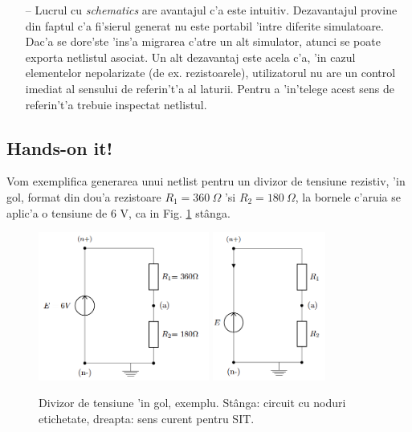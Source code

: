 \begin{itemize}
\item[--] Lucrul cu \textit{schematics} are avantajul c'a este intuitiv. Dezavantajul provine din faptul c'a fi'sierul generat nu este portabil 'intre diferite simulatoare. Dac'a se dore'ste 'ins'a migrarea c'atre un alt simulator, atunci se poate exporta netlistul asociat. Un alt dezavantaj este acela c'a, 'in cazul elementelor nepolarizate (de ex. rezistoarele), utilizatorul nu are un control imediat al sensului de referin't'a al laturii. Pentru a 'in'telege acest sens de referin't'a trebuie inspectat netlistul.
 \end{itemize} 
 
\subsection*{Hands-on it!}

Vom exemplifica generarea unui netlist pentru un divizor de tensiune rezistiv, 'in gol, format din dou'a rezistoare $R_1 = 360~\Omega$ 'si $R_2 = 180~\Omega$, la bornele c'aruia se aplic'a o tensiune de 6 V, ca in Fig. \ref{fig:spice_ex1_1_2} st\^anga. 

\begin{figure}
	\centering
		\includegraphics[width=0.5\textwidth]{laborator_01/figuri/spice_divizor_gol_ex1}
		\includegraphics[width=0.33\textwidth]{laborator_01/figuri/spice_divizor_gol_ex1_crt}
	\caption{Divizor de tensiune 'in gol, exemplu. St\^anga: circuit cu noduri etichetate, dreapta: sens curent pentru SIT.}
	\label{fig:spice_ex1_1_2}
\end{figure}

